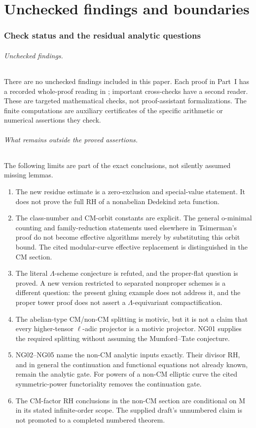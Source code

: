 \documentclass[11pt]{article}
\theoremstyle{remark}
\begin{document}
\part{Unchecked findings and boundaries}
\section{Check status and the residual analytic questions}

\paragraph{Unchecked findings.}
There are no unchecked findings included in this paper.
Each proof in Part~I has a recorded whole-proof reading in
; important cross-checks have a second reader.
These are targeted mathematical checks, not proof-assistant
formalizations.  The finite computations are auxiliary certificates
of the specific arithmetic or numerical assertions they check.

\paragraph{What remains outside the proved assertions.}
The following limits are part of the exact conclusions, not silently
assumed missing lemmas.
\begin{enumerate}
\item The new residue estimate is a zero-exclusion and special-value
statement.  It does not prove the full RH of a nonabelian
Dedekind zeta function.
\item The class-number and CM-orbit constants are explicit.
The general o-minimal counting and family-reduction statements
used elsewhere in Tsimerman's proof do not become effective algorithms
merely by substituting this orbit bound.  The cited modular-curve
effective replacement is distinguished in the CM section.
\item The literal $\Lambda$-scheme conjecture is refuted, and the
proper-flat question is proved.  A new version restricted to
separated nonproper schemes is a different question: the present
gluing example does not address it, and the proper tower proof
does not assert a $\Lambda$-equivariant compactification.
\item The abelian-type CM/non-CM splitting is motivic, but it is
not a claim that every higher-tensor $\ell$-adic projector is a
motivic projector.  NG01 supplies the required splitting without
assuming the Mumford--Tate conjecture.
\item NG02--NG05 name the non-CM analytic inputs exactly.
Their divisor RH, and in general the continuation and functional
equations not already known, remain the analytic gate.
For powers of a non-CM elliptic curve the cited symmetric-power
functoriality removes the continuation gate.
\item The CM-factor RH conclusions in the non-CM section are
conditional on M in its stated infinite-order scope.
The supplied draft's unnumbered claim is not promoted to a completed
numbered theorem.
\end{enumerate}
\end{document}
